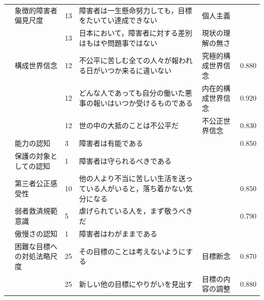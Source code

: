\begin{landscape}
\begin{longtable}{p{2cm}p{2cm}p{2cm}p{6cm}p{2cm}p{2cm}}
        \citet{Shimizu202292}    & 象徴的障害者偏見尺度                       & 13  & 障害者は一生懸命努力しても，目標をたいてい達成できない                         & 個人主義                 &         \\
                                 &                                  & 13  & 日本において，障害者に対する差別はもはや問題事ではない                         & 現状の理解の無さ             &         \\
                                 & 構成世界信念                           & 12  & 不公平に苦しむ全ての人々が報われる日がいつか来るに違いない                       & 究極的構成世界信念            & 0.880   \\
                                 &                                  & 12  & どんな人であっても自分の働いた悪事の報いはいつか受けるものである                    & 内在的構成世界信念            & 0.920   \\
                                 &                                  & 12  & 世の中の大抵のことは不公平だ                                      & 不公正世界信念              & 0.830   \\
                                 & 能力の認知                            & 3   & 障害者は有能である                                           &                      & 0.850   \\
                                 & 保護の対象としての認知                      & 1   & 障害者は守られるべきである                                       &                      &         \\
                                 & 第三者公正感受性                         & 10  & 他の人より不当に苦しい生活を送っている人がいると，落ち着かない気分になる                &                      & 0.850   \\
                                 & 弱者救済規範意識                         & 5   & 虐げられている人を，まず敬うべきだ                                   &                      & 0.790   \\
                                 & 傲慢さの認知                           & 1   & 障害者はわがままである                                         &                      &         \\
        \citet{Toyama202292}     & 困難な目標への対処法略尺度                    & 25  & その目標のことは考えないようにする                                   & 目標断念                 & 0.870   \\
                                 &                                  & 25  & 新しい他の目標にやりがいを見出す                                    & 目標の内容の調整             & 0.880   \\

\end{longtable}
\end{landscape}
